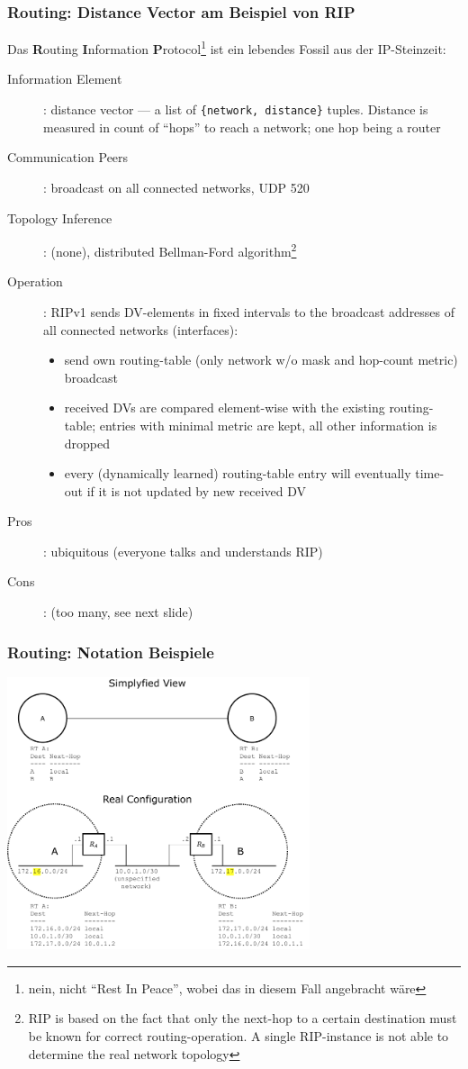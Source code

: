 \documentclass[ignorenonframetext]{beamer}
\begin{document}
\begin{frame}
\frametitle{Routing: Distance Vector am Beispiel von RIP}
Das {\bf R}outing {\bf I}nformation {\bf P}rotocol\footnote{nein, nicht ``Rest In Peace'', wobei das in diesem Fall angebracht w\"are} ist ein lebendes Fossil aus der IP-Steinzeit:
\begin{description}
	\item[Information Element]: distance vector --- a list of
		{\tt \{network, distance\}} tuples. Distance is measured in
		count of ``hops'' to reach a network; one hop being a router
	\item[Communication Peers]: broadcast on all connected networks, UDP 520
	\item[Topology Inference]: (none), distributed Bellman-Ford algorithm\footnote{RIP
		is based on the fact that only the next-hop
		to a certain destination must be known for correct routing-operation. A single
		RIP-instance is not able to determine the real network topology}
	\item[Operation]: RIPv1 sends DV-elements in fixed intervals to the broadcast
		addresses of all connected networks (interfaces):
		\begin{tiny}
		\begin{itemize}
			\item send own routing-table (only network w/o mask and hop-count metric) broadcast
			\item received DVs are compared element-wise with the existing
				routing-table; entries with minimal metric are kept, all other
				information is dropped
			\item every (dynamically learned) routing-table entry will eventually
				time-out if it is not updated by new received DV
		\end{itemize}
		\end{tiny}
	\item[Pros]: ubiquitous (everyone talks and understands RIP)
	\item[Cons]: (too many, see next slide)
\end{description}
\end{frame}

\begin{frame}
\frametitle{Routing: Notation Beispiele}
\begin{center}
\includegraphics[height=8cm]{simplified-view}
\end{center}
\end{frame}
\end{document}
